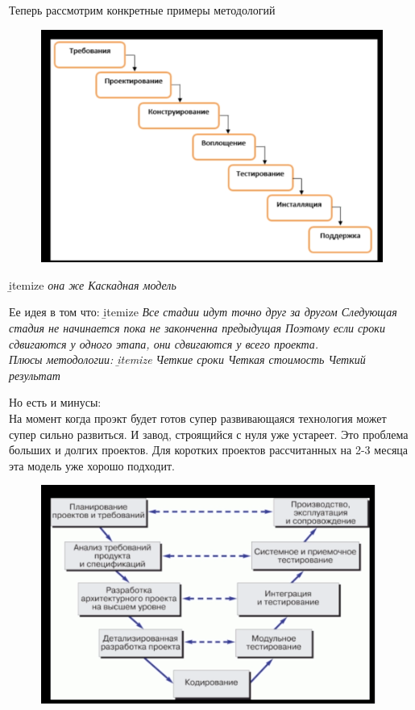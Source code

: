 \documentclass[12pt; a4paper]{book}
\theoremstyle{plain} %
\theoremstyle{defenition}
\theoremstyle{remark}
\begin{document}
Теперь рассмотрим конкретные примеры методологий

\newpage
{}
\begin{figure}[!htbp]
\includegraphics[angle=0, width=\textwidth]{IMG/11} \\
\end{figure}

\b{itemize}
\it она же Каскадная модель

Ее идея в том что:
\b{itemize}
\it Все стадии идут точно друг за другом
\it Следующая стадия не начинается пока не законченна предыдущая
Поэтому если сроки сдвигаются у одного этапа, они сдвигаются у всего проекта.\\
Плюсы методологии:
\b{itemize}
\it Четкие сроки
\it Четкая стоимость
\it Четкий результат

Но есть и минусы: \\
На момент когда проэкт будет готов супер развивающаяся технология может супер сильно развиться. И завод, строящийся с нуля уже устареет. Это проблема больших и долгих проектов. Для коротких проектов рассчитанных на 2-3 месяца эта модель уже хорошо подходит.


\newpage
{}
\begin{figure}[!htbp]
\includegraphics[angle=0, width=\textwidth]{IMG/12} \\
\end{figure}
\end{document}
